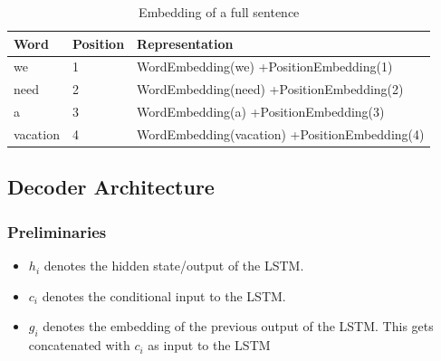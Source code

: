 \documentclass{article}
\begin{document}
\begin{center}
\begin{table}[h]
 \begin{tabu}  { | X[0.8,l] | X[0.8,l] | X[3,l] | }
 \hline
 Word & Position & Representation \\
 \hline
 we & 1 & WordEmbedding(we) +\linebreak PositionEmbedding(1)  \\ 
 \hline
 need & 2 & WordEmbedding(need) +\linebreak PositionEmbedding(2)\\
 \hline
  a & 3 & WordEmbedding(a) +\linebreak PositionEmbedding(3)\\
 \hline
 vacation & 4 & WordEmbedding(vacation) +\linebreak PositionEmbedding(4)\\
 \hline
\end{tabu}
\caption{Embedding of a full sentence}
\label{table:emb}
\end{table}
\end{center}

\subsection{Decoder Architecture}
\subsubsection{Preliminaries}
\begin{itemize}
\item $h_i$ denotes the hidden state/output of the LSTM.
\item $c_i$ denotes the conditional input to the LSTM.
\item $g_i$ denotes the embedding of the previous output of the LSTM. This gets concatenated with $c_i$ as input to the LSTM
\end{itemize}
\end{document}
